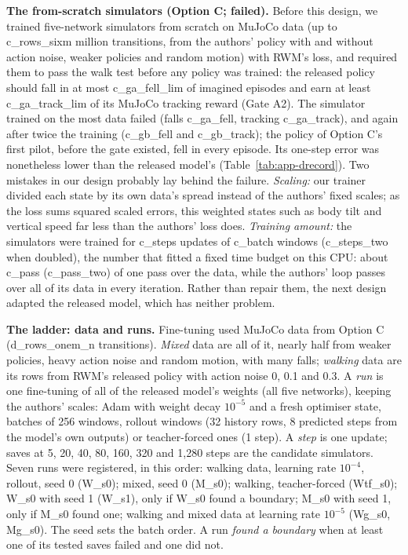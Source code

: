 \textbf{The from-scratch simulators (Option C; failed).} Before this design, we trained five-network simulators from
scratch on MuJoCo data (up to {{c_rows_sixm}} million transitions, from the authors' policy with and without action
noise, weaker policies and random motion) with RWM's loss, and required them to pass the walk test before any
policy was trained: the released policy should fall in at most {{c_ga_fell_lim}} of imagined episodes and earn at least
{{c_ga_track_lim}} of its MuJoCo tracking reward (Gate A2). The simulator trained on the most data failed (falls {{c_ga_fell}},
tracking {{c_ga_track}}), and again after twice the training ({{c_gb_fell}} and {{c_gb_track}}); the policy of Option C's first pilot, before the gate existed, fell
in every episode. Its one-step error was nonetheless lower than the released model's (Table~\ref{tab:app-drecord}). Two
mistakes in our design probably lay behind the failure. \emph{Scaling:} our trainer divided each state by its own data's spread
instead of the authors' fixed scales; as the loss sums squared scaled errors, this weighted states such as body tilt and
vertical speed far less than the authors' loss does. \emph{Training amount:} the simulators were trained for
{{c_steps}} updates of {{c_batch}} windows ({{c_steps_two}} when doubled), the number that fitted a fixed time budget
on this CPU: about {{c_pass}} ({{c_pass_two}}) of one pass over the data, while the authors' loop passes over all of its
data in every iteration. Rather than repair them, the next design adapted the released model, which has neither problem.

\textbf{The ladder: data and runs.} Fine-tuning used MuJoCo data from Option C ({{d_rows_onem_n}} transitions).
\emph{Mixed} data are all of it, nearly half from weaker policies, heavy action noise and random motion, with many
falls; \emph{walking} data are its rows from RWM's released policy with action noise 0, 0.1 and 0.3. A \emph{run} is one
fine-tuning of all of the released model's weights (all five networks), keeping the authors' scales: Adam with weight
decay $10^{-5}$ and a fresh optimiser state, batches of 256 windows, rollout windows (32 history rows, 8 predicted
steps from the model's own outputs) or teacher-forced ones (1 step). A \emph{step} is one update; saves at 5, 20, 40,
80, 160, 320 and 1,280 steps are the candidate simulators. Seven runs were registered, in this order: walking data,
learning rate $10^{-4}$, rollout, seed 0 (W\_s0); mixed, seed 0 (M\_s0); walking, teacher-forced (Wtf\_s0); W\_s0 with seed 1
(W\_s1), only if W\_s0 found a boundary; M\_s0 with seed 1, only if M\_s0 found one; walking and mixed data at
learning rate $10^{-5}$ (Wg\_s0, Mg\_s0). The seed sets the batch order. A run \emph{found a boundary} when at least one of its tested saves failed
and one did not.

